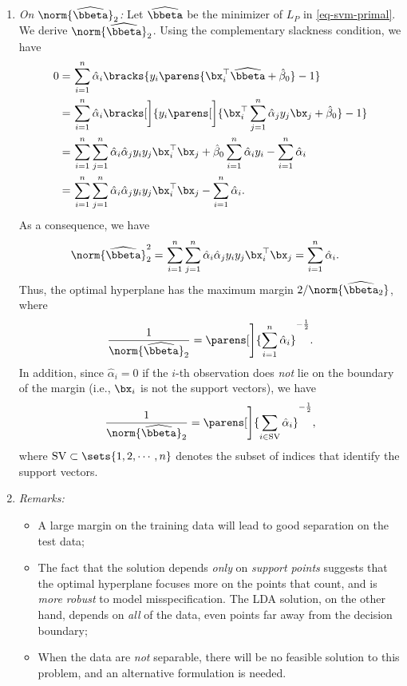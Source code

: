 \documentclass[12pt]{article}
\begin{document}
\begin{enumerate}[label=\textbf{\arabic*.}]
\begin{enumerate}
		\item \textit{On $\norm{\widehat{\bbeta}}_2$:} Let $\widehat{\bbeta}$ be the minimizer of $L_P$ in \eqref{eq-svm-primal}. We derive $\norm{\widehat{\bbeta}}_2$. Using the complementary slackness condition, we have 
		\begin{align*}
			0 = & \, \sum_{i=1}^n \hat{\alpha}_i \bracks{ y_i \parens{\bx_i^\top \widehat{\bbeta} + \hat{\beta}_0} - 1 } \\ 
			= & \, \sum_{i=1}^n \hat{\alpha}_i \bracks[\bigg]{ y_i \parens[\bigg]{\bx_i^\top \sum_{j=1}^n \hat{\alpha}_j y_j \bx_j + \hat{\beta}_0} - 1 } \\ 
			= & \, \sum_{i=1}^n \sum_{j=1}^n \hat{\alpha}_i \hat{\alpha}_j y_i y_j \bx_i^\top \bx_j + \hat{\beta}_0 \sum_{i=1}^n \hat{\alpha}_i y_i  - \sum_{i=1}^n \hat{\alpha}_i \\ 
			= & \, \sum_{i=1}^n \sum_{j=1}^n \hat{\alpha}_i \hat{\alpha}_j y_i y_j \bx_i^\top \bx_j - \sum_{i=1}^n \hat{\alpha}_i. 
		\end{align*}
		As a consequence, we have 
		\begin{align*}
			\norm{\widehat{\bbeta}}_2^2 = & \, \sum_{i=1}^n \sum_{j=1}^n \hat{\alpha}_i \hat{\alpha}_j y_i y_j \bx_i^\top \bx_j 
			= \sum_{i=1}^n \hat{\alpha}_i. 
		\end{align*}
		Thus, the optimal hyperplane has the maximum margin $2 / \norm{\widehat{\bbeta}_2}$, where 
		\begin{align*}
			\frac{1}{\norm{\widehat{\bbeta}}_2} = \parens[\Bigg]{\sum_{i=1}^n \hat{\alpha}_i}^{-\frac{1}{2}}. 
		\end{align*}
		In addition, since $\hat{\alpha}_i = 0$ if the $i$-th observation does \emph{not} lie on the boundary of the margin (i.e., $\bx_i$ is not the support vectors), we have 
		\begin{align*}
			\frac{1}{\norm{\widehat{\bbeta}}_2} = \parens[\Bigg]{\sum_{i \in \mathrm{SV}} \hat{\alpha}_i}^{-\frac{1}{2}}, 
		\end{align*}
		where $\mathrm{SV} \subset \sets{1, 2, \cdots, n}$ denotes the subset of indices that identify the support vectors. 
		
		\item \textit{Remarks:} 
		\begin{itemize}
			\item A large margin on the training data will lead to good separation on the test data; 
			\item The fact that the solution depends \emph{only} on \textit{support points} suggests that the optimal hyperplane focuses more on the points that count, and is \emph{more robust} to model misspecification. The LDA solution, on the other hand, depends on \textit{all} of the data, even points far away from the decision boundary; 
			\item When the data are \textit{not} separable, there will be no feasible solution to this problem, and an alternative formulation is needed. 
		\end{itemize}
		
	\end{enumerate}
	
\end{enumerate}
\end{document}
